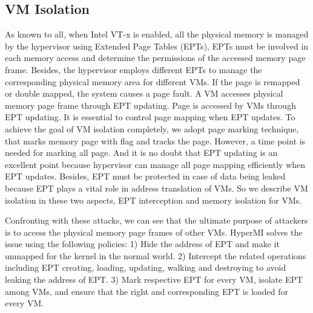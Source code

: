 \documentclass[conference]{IEEEtran}
\begin{document}



\subsection{VM Isolation}\label{VMISolation}


As known to all, when Intel VT-x is enabled, all the physical memory is managed by the hypervisor using Extended Page Tables (EPTs), EPTs must be involved in each memory access and determine the permissions of the accessed memory page frame. Besides, the hypervisor employs different EPTs to manage the corresponding physical memory area for different VMs. If the page is remapped or double mapped, the system causes a page fault. A VM accesses physical memory page frame through EPT updating. 
Page is accessed by VMs through EPT updating.
It is essential to control page mapping when EPT updates. To achieve the goal of VM isolation completely, we adopt page marking technique, that marks memory page with flag and tracks the page. However, a time point is needed for marking all page. And it is no doubt that EPT updating is an excellent point because hypervisor can manage all page mapping efficiently when EPT updates. Besides, EPT must be protected in case of data being leaked because EPT plays a vital role in address translation of VMs. So we describe VM isolation in these two aspects, EPT interception and memory isolation for VMs.







Confronting with these attacks, we can see that the ultimate purpose of attackers is to access the physical memory page frames of other VMs. HyperMI solves the issue using the following policies: 1) Hide the address of EPT and make it unmapped for the kernel in the normal world. 2) Intercept the related operations including EPT creating, loading, updating, walking and destroying to avoid leaking the address of EPT. 3) Mark respective EPT for every VM, isolate EPT among VMs, and ensure that the right and corresponding EPT is loaded for every VM.
\end{document}
